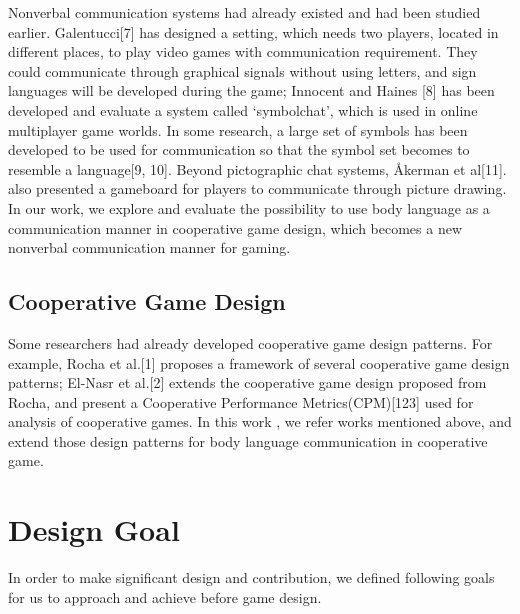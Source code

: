 \documentclass{sigchi}
\begin{document}
Nonverbal communication systems had already existed and had been studied earlier. 
Galentucci[7] has designed a setting, which needs two players, located in different places, to play video games with communication requirement.
They could communicate through graphical signals without using letters, and sign languages will be developed during the game; 
Innocent and Haines [8] has been developed and evaluate a system called ‘symbolchat’, which is used in online multiplayer game worlds. In some research, a large set of symbols has been developed to be used for communication so that the symbol set becomes to resemble a language[9, 10]. Beyond pictographic chat systems, Åkerman et al[11]. also presented a gameboard for players to communicate through picture drawing. In our work, we explore and evaluate the possibility to use body language as a communication manner in cooperative game design, which becomes a new nonverbal communication manner for gaming.

\subsection{Cooperative Game Design}
Some researchers had already developed cooperative game design patterns. For example, Rocha et al.[1] proposes a framework of several cooperative game design patterns; El-Nasr et al.[2] extends the cooperative game design proposed from Rocha, and present a Cooperative Performance Metrics(CPM)[123] used for analysis of cooperative games. 
In this work , we refer works mentioned above, and extend those design patterns for body language communication in cooperative game.

\section{Design Goal}
In order to make significant design and contribution, we defined following goals for us to approach and achieve before game design.
\end{document}
